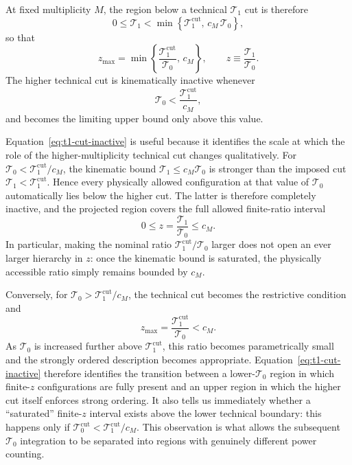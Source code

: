 \documentclass[11pt]{article}
\newcommand{\cut}{\mathrm{cut}}
\begin{document}
At fixed multiplicity \(M\), the region below a technical \(\mathcal T_1\) cut is therefore
\begin{equation}
0\le\mathcal T_1
<
\min\!\left\{
\mathcal T_1^{\cut},\,
c_M\,\mathcal T_0
\right\},
\label{eq:t1-t0-effective-upper-bound}
\end{equation}
so that
\begin{equation}
z_{\max}
=
\min\!\left\{
\frac{\mathcal T_1^{\cut}}{\mathcal T_0},\,
c_M
\right\},
\qquad
z\equiv\frac{\mathcal T_1}{\mathcal T_0}.
\label{eq:t1-t0-zmax}
\end{equation}
The higher technical cut is kinematically inactive whenever
\begin{equation}
\mathcal T_0
<
\frac{\mathcal T_1^{\cut}}{c_M},
\label{eq:t1-cut-inactive}
\end{equation}
and becomes the limiting upper bound only above this value.

Equation~\eqref{eq:t1-cut-inactive} is useful because it identifies the scale at which the role of the
higher-multiplicity technical cut changes qualitatively. For
\(\mathcal T_0<\mathcal T_1^{\cut}/c_M\), the kinematic bound
\(\mathcal T_1\le c_M\mathcal T_0\) is stronger than the imposed cut
\(\mathcal T_1<\mathcal T_1^{\cut}\). Hence every physically allowed configuration at that value of
\(\mathcal T_0\) automatically lies below the higher cut. The latter is therefore completely inactive, and
the projected region covers the full allowed finite-ratio interval
\[
0\le z=\frac{\mathcal T_1}{\mathcal T_0}\le c_M.
\]
In particular, making the nominal ratio
\(\mathcal T_1^{\cut}/\mathcal T_0\) larger does not open an ever larger hierarchy in \(z\): once the
kinematic bound is saturated, the physically accessible ratio simply remains bounded by \(c_M\).

Conversely, for
\(\mathcal T_0>\mathcal T_1^{\cut}/c_M\), the technical cut becomes the restrictive condition and
\[
z_{\max}=\frac{\mathcal T_1^{\cut}}{\mathcal T_0}<c_M.
\]
As \(\mathcal T_0\) is increased further above \(\mathcal T_1^{\cut}\), this ratio becomes parametrically
small and the strongly ordered description becomes appropriate. Equation~\eqref{eq:t1-cut-inactive}
therefore identifies the transition between a lower-\(\mathcal T_0\) region in which finite-\(z\)
configurations are fully present and an upper region in which the higher cut itself enforces strong ordering.
It also tells us immediately whether a ``saturated'' finite-\(z\) interval exists above the lower technical
boundary: this happens only if
\(\mathcal T_0^{\cut}<\mathcal T_1^{\cut}/c_M\).
This observation is what allows the subsequent \(\mathcal T_0\) integration to be separated into regions
with genuinely different power counting.
\end{document}
